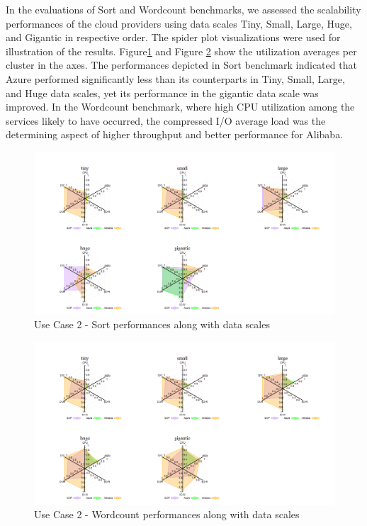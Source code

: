 \documentclass[review]{elsarticle}
\begin{document}

In the evaluations of Sort and Wordcount benchmarks, we assessed the scalability performances of the cloud providers using data scales Tiny, Small, Large, Huge, and Gigantic in respective order. The spider plot visualizations were used for illustration of the results. Figure\ref{fig:uc2-srt-new} and Figure \ref{fig:uc2-wrdcnt-new} show the utilization averages per cluster in the axes. The performances depicted in Sort benchmark indicated that Azure performed significantly less than its counterparts in Tiny, Small, Large, and Huge data scales, yet its performance in the gigantic data scale was improved. In the Wordcount benchmark, where high CPU utilization among the services likely to have occurred, the compressed I/O average load was the determining aspect of higher throughput and better performance for Alibaba.

\begin{figure}[p]
	\caption{Use Case 2 - Sort performances along with data scales}
	\label{fig:uc2-srt-new}
	\includegraphics[width=\textwidth]{uc2-srt-new}
	\centering
\end{figure}

\begin{figure}[p]
	\caption{Use Case 2 - Wordcount performances along with data scales}
	\label{fig:uc2-wrdcnt-new}
	\includegraphics[width=\textwidth]{uc2-wrdcnt-new}
	\centering
\end{figure}
\end{document}
